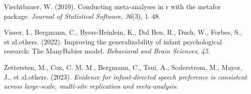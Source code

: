 \documentclass[
  man]{apa6}
\newlength{\cslhangindent}
\newlength{\cslentryspacingunit} %
\newenvironment{CSLReferences}[2] %
 {%
  \setlength{\parindent}{0pt}
  \ifodd #1
  \let\oldpar\par
  \def\par{\hangindent=\cslhangindent\oldpar}
  \fi
  \setlength{\parskip}{#2\cslentryspacingunit}
 }%
 {}
\begin{document}
\begin{CSLReferences}{1}{0}
\leavevmode{}%
Viechtbauer, W. (2010). Conducting meta-analyses in r with the metafor package. \emph{Journal of Statistical Software}, \emph{36}(3), 1--48.

\leavevmode{}%
Visser, I., Bergmann, C., Byers-Heinlein, K., Dal Ben, R., Duch, W., Forbes, S., et al.others. (2022). Improving the generalizability of infant psychological research: The ManyBabies model. \emph{Behavioral and Brain Sciences}, \emph{45}.

\leavevmode{}%
Zettersten, M., Cox, C. M. M., Bergmann, C., Tsui, A., Soderstrom, M., Mayor, J., et al.others. (2023). \emph{Evidence for infant-directed speech preference is consistent across large-scale, multi-site replication and meta-analysis}.

\end{CSLReferences}
\end{document}
